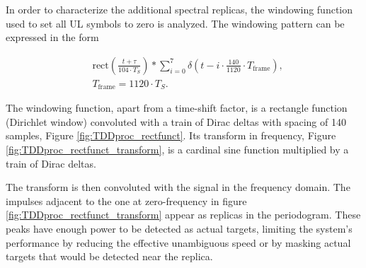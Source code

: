     In order to characterize the additional spectral replicas, the windowing function used to set all UL symbols to zero is analyzed. The windowing pattern can be expressed in the form
    
    \begin{align}
        &\text{rect}\left( \frac{t + \tau}{104 \cdot T_S}\right) \ast \sum_{i=0}^7 \delta\left( t - i\cdot \frac{140}{1120}\cdot T_{\text{frame}} \right),  \\
        &T_{\text{frame}} = 1120 \cdot T_S.
    \end{align}

    The windowing function, apart from a time-shift factor, is a rectangle function (Dirichlet window) convoluted with a train of Dirac deltas with spacing of 140 samples, Figure \ref{fig:TDDproc_rectfunct}. Its transform in frequency, Figure \ref{fig:TDDproc_rectfunct_transform}, is a cardinal sine function multiplied by a train of Dirac deltas.

    The transform is then convoluted with the signal in the frequency domain. The impulses adjacent to the one at zero-frequency in figure \ref{fig:TDDproc_rectfunct_transform} appear as replicas in the periodogram. These peaks have enough power to be detected as actual targets, limiting the system's performance by reducing the effective unambiguous speed or by masking actual targets that would be detected near the replica. 

